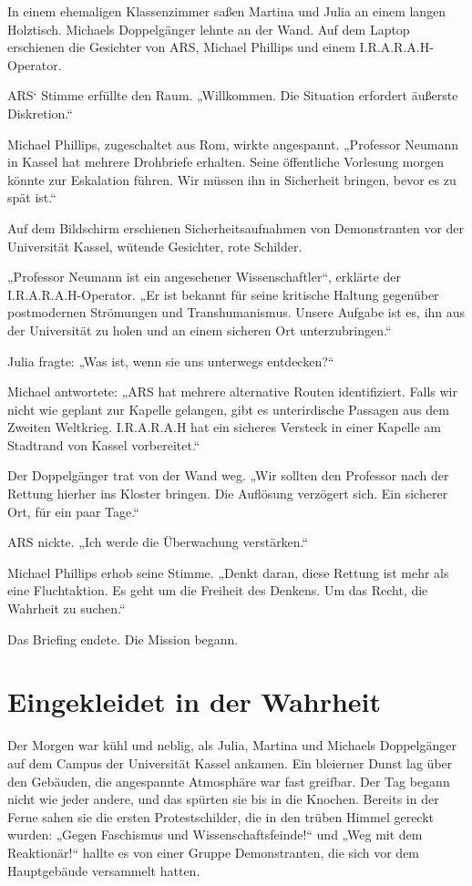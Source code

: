 \documentclass[
]{article}
\begin{document}
In einem ehemaligen Klassenzimmer saßen Martina und Julia an einem langen Holztisch. Michaels Doppelgänger lehnte an der Wand. Auf dem Laptop erschienen die Gesichter von ARS, Michael Phillips und einem I.R.A.R.A.H-Operator.

ARS` Stimme erfüllte den Raum. „Willkommen. Die Situation erfordert äußerste Diskretion.``

Michael Phillips, zugeschaltet aus Rom, wirkte angespannt. „Professor Neumann in Kassel hat mehrere Drohbriefe erhalten. Seine öffentliche Vorlesung morgen könnte zur Eskalation führen. Wir müssen ihn in Sicherheit bringen, bevor es zu spät ist.``

Auf dem Bildschirm erschienen Sicherheitsaufnahmen von Demonstranten vor der Universität Kassel, wütende Gesichter, rote Schilder.

„Professor Neumann ist ein angesehener Wissenschaftler``, erklärte der I.R.A.R.A.H-Operator. „Er ist bekannt für seine kritische Haltung gegenüber postmodernen Strömungen und Transhumanismus. Unsere Aufgabe ist es, ihn aus der Universität zu holen und an einem sicheren Ort unterzubringen.``

Julia fragte: „Was ist, wenn sie uns unterwegs entdecken?{\kern0pt}``

Michael antwortete: „ARS hat mehrere alternative Routen identifiziert. Falls wir nicht wie geplant zur Kapelle gelangen, gibt es unterirdische Passagen aus dem Zweiten Weltkrieg. I.R.A.R.A.H hat ein sicheres Versteck in einer Kapelle am Stadtrand von Kassel vorbereitet.``

Der Doppelgänger trat von der Wand weg. „Wir sollten den Professor nach der Rettung hierher ins Kloster bringen. Die Auflösung verzögert sich. Ein sicherer Ort, für ein paar Tage.``

ARS nickte. „Ich werde die Überwachung verstärken.``

Michael Phillips erhob seine Stimme. „Denkt daran, diese Rettung ist mehr als eine Fluchtaktion. Es geht um die Freiheit des Denkens. Um das Recht, die Wahrheit zu suchen.``

Das Briefing endete. Die Mission begann.

\section{Eingekleidet in der Wahrheit}\label{eingekleidet-in-der-wahrheit}

Der Morgen war kühl und neblig, als Julia, Martina und Michaels Doppelgänger auf dem Campus der Universität Kassel ankamen. Ein bleierner Dunst lag über den Gebäuden, die angespannte Atmosphäre war fast greifbar. Der Tag begann nicht wie jeder andere, und das spürten sie bis in die Knochen. Bereits in der Ferne sahen sie die ersten Protestschilder, die in den trüben Himmel gereckt wurden: „Gegen Faschismus und Wissenschaftsfeinde!{\kern0pt}`` und „Weg mit dem Reaktionär!{\kern0pt}`` hallte es von einer Gruppe Demonstranten, die sich vor dem Hauptgebäude versammelt hatten.
\end{document}
